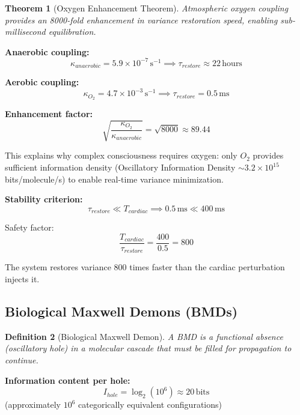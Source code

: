 \documentclass[12pt,a4paper]{article}
\newtheorem{theorem}{Theorem}[section]
\newtheorem{definition}[theorem]{Definition}
\begin{document}
\begin{theorem}[Oxygen Enhancement Theorem]
Atmospheric oxygen coupling provides an 8000-fold enhancement in variance restoration speed, enabling sub-millisecond equilibration.
\end{theorem}

\textbf{Anaerobic coupling:}
\begin{equation}
\kappa_{anaerobic} = 5.9 \times 10^{-7} \, \text{s}^{-1} \implies \tau_{restore} \approx 22 \, \text{hours}
\end{equation}

\textbf{Aerobic coupling:}
\begin{equation}
\kappa_{O_2} = 4.7 \times 10^{-3} \, \text{s}^{-1} \implies \tau_{restore} = 0.5 \, \text{ms}
\end{equation}

\textbf{Enhancement factor:}
\begin{equation}
\sqrt{\frac{\kappa_{O_2}}{\kappa_{anaerobic}}} = \sqrt{8000} \approx 89.44
\end{equation}

This explains why complex consciousness requires oxygen: only $O_2$ provides sufficient information density (Oscillatory Information Density $\sim 3.2 \times 10^{15}$ bits/molecule/s) to enable real-time variance minimization.

\textbf{Stability criterion:}
\begin{equation}
\tau_{restore} \ll T_{cardiac} \implies 0.5 \, \text{ms} \ll 400 \, \text{ms}
\end{equation}

Safety factor:
\begin{equation}
\frac{T_{cardiac}}{\tau_{restore}} = \frac{400}{0.5} = 800
\end{equation}

The system restores variance 800 times faster than the cardiac perturbation injects it.

\subsection{Biological Maxwell Demons (BMDs)}

\begin{definition}[Biological Maxwell Demon]
A BMD is a functional absence (oscillatory hole) in a molecular cascade that must be filled for propagation to continue.
\end{definition}

\textbf{Information content per hole:}
\begin{equation}
I_{hole} = \log_2(10^6) \approx 20 \, \text{bits}
\end{equation}
(approximately $10^6$ categorically equivalent configurations)
\end{document}
